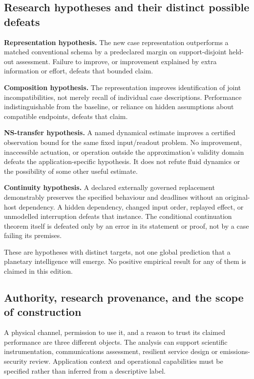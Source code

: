 \documentclass[11pt,a4paper]{article}
\theoremstyle{definition}
\theoremstyle{remark}
\begin{document}
\subsection{Research hypotheses and their distinct possible defeats}
\textbf{Representation hypothesis.} The new case representation outperforms a matched conventional schema by a predeclared margin on support-disjoint held-out assessment. Failure to improve, or improvement explained by extra information or effort, defeats that bounded claim.

\textbf{Composition hypothesis.} The representation improves identification of joint incompatibilities, not merely recall of individual case descriptions. Performance indistinguishable from the baseline, or reliance on hidden assumptions about compatible endpoints, defeats that claim.

\textbf{NS-transfer hypothesis.} A named dynamical estimate improves a certified observation bound for the same fixed input/readout problem. No improvement, inaccessible actuation, or operation outside the approximation's validity domain defeats the application-specific hypothesis. It does not refute fluid dynamics or the possibility of some other useful estimate.

\textbf{Continuity hypothesis.} A declared externally governed replacement demonstrably preserves the specified behaviour and deadlines without an original-host dependency. A hidden dependency, changed input order, replayed effect, or unmodelled interruption defeats that instance. The conditional continuation theorem itself is defeated only by an error in its statement or proof, not by a case failing its premises.

These are hypotheses with distinct targets, not one global prediction that a planetary intelligence will emerge. No positive empirical result for any of them is claimed in this edition.


\subsection{Authority, research provenance, and the scope of construction}\label{sec:governance}
A physical channel, permission to use it, and a reason to trust its claimed performance are three different objects. The analysis can support scientific instrumentation, communications assessment, resilient service design or emissions-security review. Application context and operational capabilities must be specified rather than inferred from a descriptive label.
\end{document}
